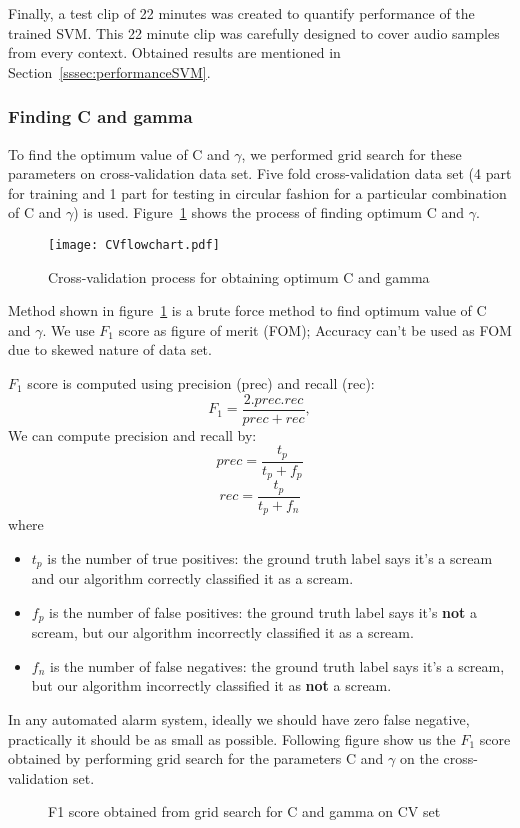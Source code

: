Finally, a test clip of 22 minutes was created to quantify performance of the trained SVM. This 22 minute clip was carefully designed to cover audio samples from every context. Obtained results are mentioned in Section~\ref{sssec:performanceSVM}.

\subsubsection{Finding C and gamma} 
\label{sssec:FindCandgamma}
To find the optimum value of C and \(\gamma\), we performed grid search for these parameters on cross-validation data set. Five fold cross-validation data set (4 part for training and 1 part for testing in circular fashion for a particular combination of C and \(\gamma\)) is used. Figure~\ref{fig:CVflowchart} shows the process of finding optimum C and \(\gamma\).

\begin{figure}[H]
\centering
\texttt{[image: CVflowchart.pdf]}
\caption{Cross-validation process for obtaining optimum C and gamma}
\label{fig:CVflowchart}
\end{figure}

Method shown in figure~\ref{fig:CVflowchart} is a brute force method to find optimum value of C and \(\gamma\). We use \(F_1\) score as figure of merit (FOM); Accuracy can't be used as FOM due to skewed nature of data set.

\(F_1\) score is computed using precision (prec) and recall (rec):\[F_1=\dfrac{2 . prec . rec}{prec+rec},\] We can compute precision and recall by: \[prec=\dfrac{t_p}{t_p+f_p}\]
\[rec=\dfrac{t_p}{t_p+f_n}\]
where
\begin{itemize}
\item \(t_p\) is the number of true positives: the ground truth label says it's a scream and our algorithm correctly classified it as a scream.
\item \(f_p\) is the number of false positives: the ground truth label says it's \textbf{not} a scream, but our algorithm incorrectly classified it as a scream.
\item \(f_n\) is the number of false negatives: the ground truth label says it's a scream, but our algorithm incorrectly classified it as \textbf{not} a scream.
\end{itemize}

In any automated alarm system, ideally we should have zero false negative, practically it should be as small as possible. Following figure show us the $F_1$ score obtained by performing grid search for the parameters C and \(\gamma\) on the cross-validation set.
\begin{figure}[H]
\centering
\def\svgwidth{\textwidth}

\caption{F1 score obtained from grid search for C and gamma on CV set}
\label{fig:f1score}
\end{figure} 

